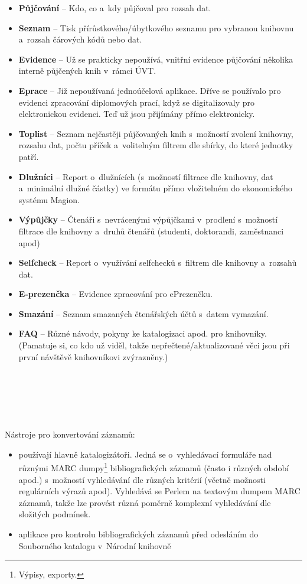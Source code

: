 \documentclass[
	11pt, oneside, printed, final, palatino
	microtype,
	table,   %
	lof,     %
	lot     %
]{fithesis3}
\newcommand{\bold}[1]{\textbf{#1}}
\begin{document}
{\begin{itemize}
\item \bold{Půjčování} – Kdo, co a~kdy půjčoval pro rozsah dat.
\item \bold{Seznam} – Tisk přírůstkového/úbytkového seznamu pro vybranou knihovnu a~rozsah čárových kódů nebo dat.
\item \bold{Evidence} – Už se prakticky nepoužívá, vnitřní evidence půjčování několika interně půjčených knih v~rámci ÚVT.
\item \bold{Eprace} – Již nepoužívaná jednoúčelová aplikace. Dříve se používalo pro evidenci zpracování diplomových prací, když se digitalizovaly pro elektronickou evidenci. Teď už jsou přijímány přímo elektronicky.
\item \bold{Toplist} – Seznam nejčastěji půjčovaných knih s~možností zvolení knihovny, rozsahu dat, počtu příček a~volitelným filtrem dle sbírky, do které jednotky patří.
\item \bold{Dlužníci} – Report o~dlužnících (s~možností filtrace dle knihovny, dat a~minimální dlužné částky) ve formátu přímo vložitelném do ekonomického systému Magion.
\item \bold{Výpůjčky} – Čtenáři s~nevrácenými výpůjčkami v~prodlení s~možností filtrace dle knihovny a~druhů čtenářů (studenti, doktorandi, zaměstnanci apod)
\item \bold{Selfcheck} – Report o~využívání selfchecků s~filtrem dle knihovny a~rozsahů dat.
\item \bold{E-prezenčka} – Evidence zpracování pro ePrezenčku.
\item \bold{Smazání} – Seznam smazaných čtenářských účtů s~datem vymazání.
\item \bold{FAQ} – Různé návody, pokyny ke katalogizaci apod. pro knihovníky. (Pamatuje si, co kdo už viděl, takže nepřečtené/aktualizované věci jsou při první návštěvě knihovníkovi zvýrazněny.)
\end{itemize}
~\\~\\~\\~\\~\\%
Nástroje pro konvertování záznamů:

\begin{itemize}
\item používají hlavně katalogizátoři. Jedná se o~vyhledávací formuláře nad různými MARC dumpy\footnote{Výpisy, exporty.} bibliografických záznamů (často i různých období apod.) s~možností vyhledávání dle různých kritérií (včetně možnosti regulárních výrazů apod). Vyhledává se Perlem na textovým dumpem MARC záznamů, takže lze provést různá poměrně komplexní vyhledávání dle složitých podmínek. 
\item aplikace pro kontrolu bibliografických záznamů před odesláním do Souborného katalogu v~Národní knihovně
\end{itemize}

}
\end{document}
